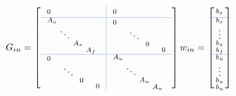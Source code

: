 \[
	G_{in} =
	\left[
		\begin{array}{l!{\color{RoyalBlue!50}\vrule}l}
			\noalign{\arrayrulewidth=0.1mm}\arrayrulecolor{RoyalBlue!50}
			\begin{smallmatrix}
				0&&&
			\end{smallmatrix}
			 &
			\begin{smallmatrix}
				0&&&
			\end{smallmatrix}
			\\ \hline
			\begin{smallmatrix}
				A_x&&&\\
				&\ddots&\\
				&&		A_x&\\
				&&&		A_f
			\end{smallmatrix}
			 &
			\begin{smallmatrix}
				0\ \ &&&\\
				&\ \ddots\\
				&&\ 0\ &\\
				&&&\ \ 0
			\end{smallmatrix}
			\\ \hline
			\begin{smallmatrix}
				0\ \ &&&\\
				&\ \ddots\\
				&&\ 0\ &\\
				&&&\ \ 0
			\end{smallmatrix}
			 &
			\begin{smallmatrix}
				A_u&&\\
				&\ddots&\\
				&&A_u&\\
				&&&A_u
			\end{smallmatrix}
		\end{array}
		\right]
	w_{in} =
	\begin{bmatrix}
		\noalign{\arrayrulewidth=0.1mm}\arrayrulecolor{RoyalBlue!50}
		\begin{smallmatrix}
			b_x\\
		\end{smallmatrix}
		\\ \hline
		\begin{smallmatrix}
			b_x\\
			\vdots\\
			b_x\\
			b_f\\
		\end{smallmatrix}
		\\ \hline
		\begin{smallmatrix}
			b_u\\
			\vdots\\
			b_u\\
			b_u\\
		\end{smallmatrix}
	\end{bmatrix}
\]

